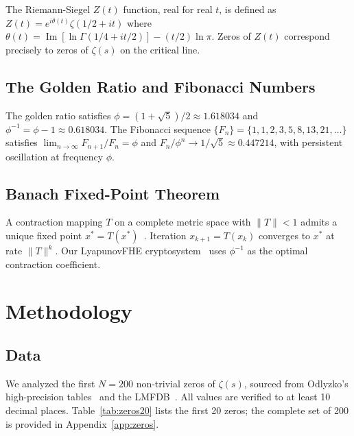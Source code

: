\documentclass[11pt,a4paper]{article}
\DeclareMathOperator{\Ima}{Im}
\begin{document}
The Riemann-Siegel $Z(t)$ function, real for real $t$, is defined as $Z(t) = e^{i\theta(t)} \zeta(1/2 + it)$ where $\theta(t) = \Ima[\ln\Gamma(1/4 + it/2)] - (t/2)\ln\pi$. Zeros of $Z(t)$ correspond precisely to zeros of $\zeta(s)$ on the critical line.

\subsection{The Golden Ratio and Fibonacci Numbers}

The golden ratio satisfies $\phi = (1+\sqrt{5})/2 \approx 1.618034$ and $\phi^{-1} = \phi - 1 \approx 0.618034$. The Fibonacci sequence $\{F_n\} = \{1, 1, 2, 3, 5, 8, 13, 21, \ldots\}$ satisfies $\lim_{n\to\infty} F_{n+1}/F_n = \phi$ and $F_n/\phi^n \to 1/\sqrt{5} \approx 0.447214$, with persistent oscillation at frequency $\phi$.

\subsection{Banach Fixed-Point Theorem}

A contraction mapping $T$ on a complete metric space with $\|T\| < 1$ admits a unique fixed point $x^* = T(x^*)$~\cite{banach1922}. Iteration $x_{k+1} = T(x_k)$ converges to $x^*$ at rate $\|T\|^k$. Our LyapunovFHE cryptosystem~\cite{fernandez2026fhe} uses $\phi^{-1}$ as the optimal contraction coefficient.

\newpage

\section{Methodology}
\label{sec:methodology}

\subsection{Data}

We analyzed the first $N = 200$ non-trivial zeros of $\zeta(s)$, sourced from Odlyzko's high-precision tables~\cite{odlyzko2001} and the LMFDB~\cite{lmfdb2024}. All values are verified to at least 10 decimal places. Table~\ref{tab:zeros20} lists the first 20 zeros; the complete set of 200 is provided in Appendix~\ref{app:zeros}.
\end{document}
